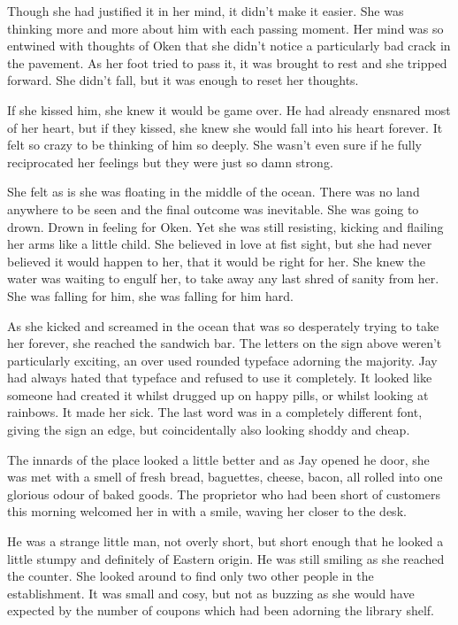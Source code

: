 Though she had justified it in her mind, it didn't make it easier.  She was thinking more and more about him with each passing moment.  Her mind was so entwined with thoughts of Oken that she didn't notice a particularly bad crack in the pavement.  As her foot tried to pass it, it was brought to rest and she tripped forward.  She didn't fall, but it was enough to reset her thoughts.

If she kissed him, she knew it would be game over.  He had already ensnared most of her heart, but if they kissed, she knew she would fall into his heart forever.  It felt so crazy to be thinking of him so deeply.  She wasn't even sure if he fully reciprocated her feelings but they were just so damn strong.

She felt as is she was floating in the middle of the ocean.  There was no land anywhere to be seen and the final outcome was inevitable.  She was going to drown.  Drown in feeling for Oken.  Yet she was still resisting, kicking and flailing her arms like a little child.  She believed in love at fist sight, but she had never believed it would happen to her, that it would be right for her.  She knew the water was waiting to engulf her, to take away any last shred of sanity from her.  She was falling for him, she was falling for him hard.

As she kicked and screamed in the ocean that was so desperately trying to take her forever, she reached the sandwich bar.  The letters on the sign above weren't particularly exciting, an over used rounded typeface adorning the majority.  Jay had always hated that typeface and refused to use it completely.  It looked like someone had created it whilst drugged up on happy pills, or whilst looking at rainbows.  It made her sick.  The last word was in a completely different font, giving the sign an edge, but coincidentally also looking shoddy and cheap.

The innards of the place looked a little better and as Jay opened he door, she was met with a smell of fresh bread, baguettes, cheese, bacon, all rolled into one glorious odour of baked goods.  The proprietor who had been short of customers this morning welcomed her in with a smile, waving her closer to the desk.

He was a strange little man, not overly short, but short enough that he looked a little stumpy and definitely of Eastern origin.  He was still smiling as she reached the counter.  She looked around to find only two other people in the establishment.  It was small and cosy, but not as buzzing as she would have expected by the number of coupons which had been adorning the library shelf.

